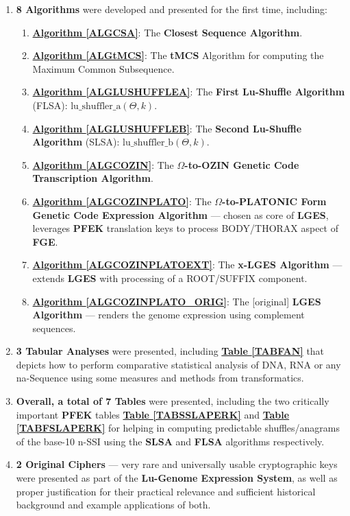 \documentclass[a4paper, 18pt]{book} %
\begin{document}
\begin{enumerate}
{ 
 }
\item{\textbf{8 Algorithms} were developed and presented for the first time, including:
	\begin{enumerate}
	\item \textbf{\hyperref[ALGCSA]{Algorithm \ref{ALGCSA}}}: The \textbf{Closest Sequence Algorithm}.
	\item \textbf{\hyperref[ALGtMCS]{Algorithm \ref{ALGtMCS}}}: The \textbf{tMCS} Algorithm for computing the Maximum Common Subsequence.
		\item \textbf{\hyperref[ALGLUSHUFFLEA]{Algorithm \ref{ALGLUSHUFFLEA}}}: The \textbf{First Lu-Shuffle Algorithm} (FLSA): $\text{lu\_shuffler\_a}(\Theta, k)$.
	\item \textbf{\hyperref[ALGLUSHUFFLEB]{Algorithm \ref{ALGLUSHUFFLEB}}}: The \textbf{Second Lu-Shuffle Algorithm} (SLSA): $\text{lu\_shuffler\_b}(\Theta, k)$.
	\item \textbf{\hyperref[ALGCOZIN]{Algorithm \ref{ALGCOZIN}}}: The \textbf{$\Omega$-to-OZIN Genetic Code Transcription Algorithm}.
	\item \textbf{\hyperref[ALGCOZINPLATO]{Algorithm \ref{ALGCOZINPLATO}}}: The \textbf{$\Omega$-to-PLATONIC Form Genetic Code Expression Algorithm} --- chosen as core of \textbf{LGES}, leverages \textbf{PFEK} translation keys to process BODY/THORAX aspect of \textbf{FGE}.
	\item \textbf{\hyperref[ALGCOZINPLATOEXT]{Algorithm \ref{ALGCOZINPLATOEXT}}}: The \textbf{x-LGES Algorithm} --- extends \textbf{LGES} with processing of a ROOT/SUFFIX component.

	\item \textbf{\hyperref[ALGCOZINPLATO_ORIG]{Algorithm \ref{ALGCOZINPLATO_ORIG}}}: The [original] \textbf{LGES Algorithm} --- renders the genome expression using complement sequences.
	\end{enumerate}
}
\item \textbf{3 Tabular Analyses} were presented, including \textbf{\hyperref[TABFAN]{Table \ref{TABFAN}}} that depicts how to perform comparative statistical analysis of DNA, RNA or any na-Sequence using some measures and methods from transformatics.
\item \textbf{Overall, a total of 7 Tables} were presented, including the two critically important \textbf{PFEK} tables \textbf{\hyperref[TABSSLAPERK]{Table \ref{TABSSLAPERK}}} and \textbf{\hyperref[TABFSLAPERK]{Table \ref{TABFSLAPERK}}} for helping in computing predictable shuffles/anagrams of the base-10 n-SSI using the \textbf{SLSA} and \textbf{FLSA} algorithms respectively.
\item{ \textbf{2 Original Ciphers} --- very rare and universally usable cryptographic keys were presented as part of the \textbf{Lu-Genome Expression System}, as well as proper justification for their practical relevance and sufficient historical background and example applications of both.

}
\end{enumerate}
\end{document}
